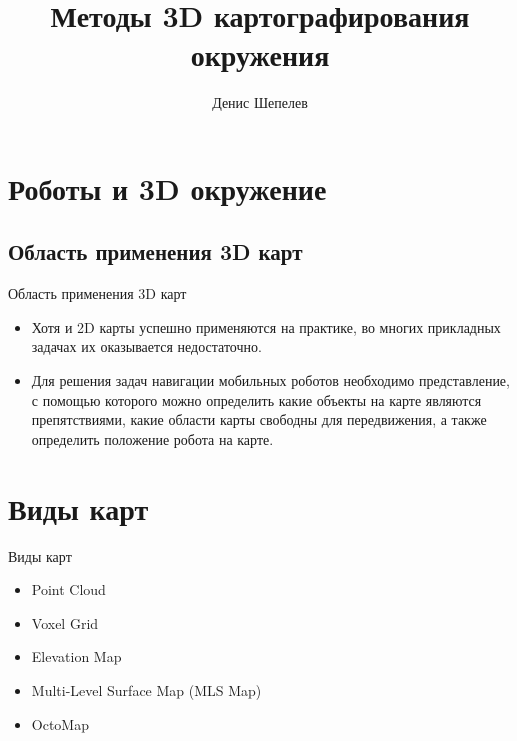\documentclass[9pt]{beamer}
\title{Методы 3D картографирования окружения}
\author{Денис Шепелев}
\institute[Universities of Somewhere and Elsewhere] %
{
  073а\\
}
\date{}
\begin{document}
\begin{frame}
  \titlepage
\end{frame}


\section{Роботы и 3D окружение}

\subsection{Область применения 3D карт}

\begin{frame}{Область применения 3D карт}
  \begin{itemize}
  \item 
  {
    Хотя и 2D карты успешно применяются на практике, во многих прикладных задачах их оказывается недостаточно. 
  }
  \item 
  {
    Для решения задач навигации мобильных роботов необходимо представление, с помощью которого можно определить какие объекты на карте являются препятствиями, какие области карты свободны для передвижения, а также определить положение робота на карте.
  }
  \end{itemize}
\end{frame}

\section{Виды карт}

\begin{frame}{Виды карт}
  \begin{itemize}
  \item 
  {
    Point Cloud  
  }
  \item 
  {   
    Voxel Grid
  }
  \item
  {
    Elevation Map
  }
  \item
  {
    Multi-Level Surface Map (MLS Map) 
  }
  \item
  {
    OctoMap
  }
  \end{itemize}
\end{frame}
\end{document}
